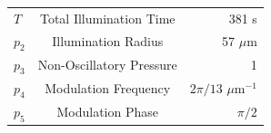 \documentclass[aps, prl, twocolumn, groupedaddress]{revtex4-1}
\begin{document}
\begin{table}
\begin{ruledtabular}
\begin{tabular}{l c r}
                                                                                                                                                                                                                                                                                                                                                                                                                                                                                                                                  $T$& Total Illumination Time&381 s\\
                                                                                                                                                                                                                                                                                                                                                                                                                                                                                                                                  $p_2$&Illumination Radius&57 $\mu$m\\
                                                                                                                                                                                                                                                                                                                                                                                                                                                                                                                                  $p_3$&Non-Oscillatory Pressure&1\\
                                                                                                                                                                                                                                                                                                                                                                                                                                                                                                                                  $p_4$&Modulation Frequency&$2\pi/13$ $\mu$m$^{-1}$\\
                                                                                                                                                                                                                                                                                                                                                                                                                                                                                                                                  $p_5$&Modulation Phase&$\pi/2$\\

\end{tabular}
\end{ruledtabular}
\end{table}
\end{document}
